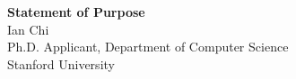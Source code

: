 \documentclass[11pt]{article}
\begin{document}
\begin{center}
    {\Large \textbf{Statement of Purpose}}\\[4pt]
    {\large Ian Chi}\\[2pt]
    Ph.D. Applicant, Department of Computer Science\\
    Stanford University
\end{center}

\vspace{1em}

\end{document}
